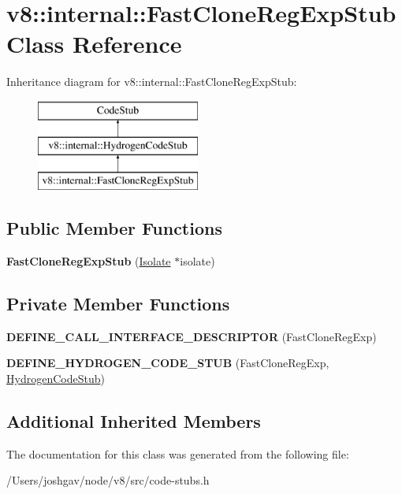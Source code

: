 \hypertarget{classv8_1_1internal_1_1_fast_clone_reg_exp_stub}{}\section{v8\+:\+:internal\+:\+:Fast\+Clone\+Reg\+Exp\+Stub Class Reference}
\label{classv8_1_1internal_1_1_fast_clone_reg_exp_stub}
Inheritance diagram for v8\+:\+:internal\+:\+:Fast\+Clone\+Reg\+Exp\+Stub\+:\begin{figure}[H]
\begin{center}
\leavevmode
\includegraphics[height=3.000000cm]{classv8_1_1internal_1_1_fast_clone_reg_exp_stub}
\end{center}
\end{figure}
\subsection*{Public Member Functions}
\begin{DoxyCompactItemize}
\item 
{\bfseries Fast\+Clone\+Reg\+Exp\+Stub} (\hyperlink{classv8_1_1internal_1_1_isolate}{Isolate} $\ast$isolate)\hypertarget{classv8_1_1internal_1_1_fast_clone_reg_exp_stub_af73b44d328f2e3fb6bee7f4c64d58268}{}\label{classv8_1_1internal_1_1_fast_clone_reg_exp_stub_af73b44d328f2e3fb6bee7f4c64d58268}

\end{DoxyCompactItemize}
\subsection*{Private Member Functions}
\begin{DoxyCompactItemize}
\item 
{\bfseries D\+E\+F\+I\+N\+E\+\_\+\+C\+A\+L\+L\+\_\+\+I\+N\+T\+E\+R\+F\+A\+C\+E\+\_\+\+D\+E\+S\+C\+R\+I\+P\+T\+OR} (Fast\+Clone\+Reg\+Exp)\hypertarget{classv8_1_1internal_1_1_fast_clone_reg_exp_stub_a09965962f460c083fbd52871ddaf12d8}{}\label{classv8_1_1internal_1_1_fast_clone_reg_exp_stub_a09965962f460c083fbd52871ddaf12d8}

\item 
{\bfseries D\+E\+F\+I\+N\+E\+\_\+\+H\+Y\+D\+R\+O\+G\+E\+N\+\_\+\+C\+O\+D\+E\+\_\+\+S\+T\+UB} (Fast\+Clone\+Reg\+Exp, \hyperlink{classv8_1_1internal_1_1_hydrogen_code_stub}{Hydrogen\+Code\+Stub})\hypertarget{classv8_1_1internal_1_1_fast_clone_reg_exp_stub_a15b4c2e898a784e85292d80aa2c52680}{}\label{classv8_1_1internal_1_1_fast_clone_reg_exp_stub_a15b4c2e898a784e85292d80aa2c52680}

\end{DoxyCompactItemize}
\subsection*{Additional Inherited Members}


The documentation for this class was generated from the following file\+:\begin{DoxyCompactItemize}
\item 
/\+Users/joshgav/node/v8/src/code-\/stubs.\+h\end{DoxyCompactItemize}
